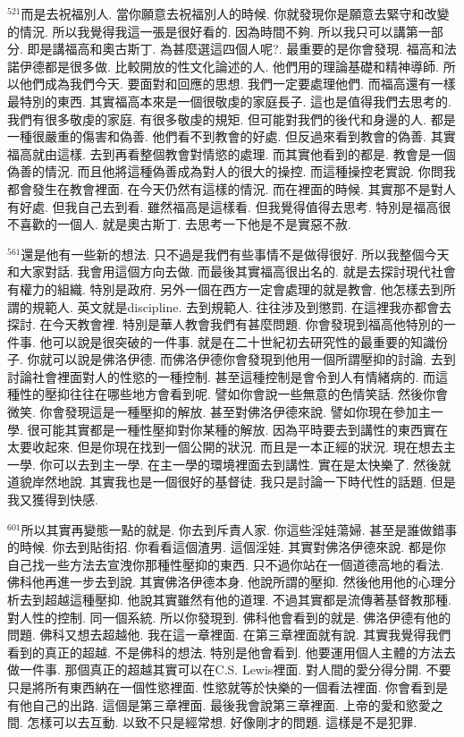 \documentclass{book}
\begin{document}
$^{521}$而是去祝福別人.
當你願意去祝福別人的時候.
你就發現你是願意去緊守和改變的情況.
所以我覺得我這一張是很好看的.
因為時間不夠.
所以我只可以講第一部分.
即是講福高和奧古斯丁.
為甚麼選這四個人呢?.
最重要的是你會發現.
福高和法諾伊德都是很多做.
比較開放的性文化論述的人.
他們用的理論基礎和精神導師.
所以他們成為我們今天.
要面對和回應的思想.
我們一定要處理他們.
而福高還有一樣最特別的東西.
其實福高本來是一個很敬虔的家庭長子.
這也是值得我們去思考的.
我們有很多敬虔的家庭.
有很多敬虔的規矩.
但可能對我們的後代和身邊的人.
都是一種很嚴重的傷害和偽善.
他們看不到教會的好處.
但反過來看到教會的偽善.
其實福高就由這樣.
去到再看整個教會對情慾的處理.
而其實他看到的都是.
教會是一個偽善的情況.
而且他將這種偽善成為對人的很大的操控.
而這種操控老實說.
你問我都會發生在教會裡面.
在今天仍然有這樣的情況.
而在裡面的時候.
其實那不是對人有好處.
但我自己去到看.
雖然福高是這樣看.
但我覺得值得去思考.
特別是福高很不喜歡的一個人.
就是奧古斯丁.
去思考一下他是不是實惡不赦.

$^{561}$還是他有一些新的想法.
只不過是我們有些事情不是做得很好.
所以我整個今天和大家對話.
我會用這個方向去做.
而最後其實福高很出名的.
就是去探討現代社會有權力的組織.
特別是政府.
另外一個在西方一定會處理的就是教會.
他怎樣去到所謂的規範人.
英文就是discipline.
去到規範人.
往往涉及到懲罰.
在這裡我亦都會去探討.
在今天教會裡.
特別是華人教會我們有甚麼問題.
你會發現到福高他特別的一件事.
他可以說是很突破的一件事.
就是在二十世紀初去研究性的最重要的知識份子.
你就可以說是佛洛伊德.
而佛洛伊德你會發現到他用一個所謂壓抑的討論.
去到討論社會裡面對人的性慾的一種控制.
甚至這種控制是會令到人有情緒病的.
而這種性的壓抑往往在哪些地方會看到呢.
譬如你會說一些無意的色情笑話.
然後你會微笑.
你會發現這是一種壓抑的解放.
甚至對佛洛伊德來說.
譬如你現在參加主一學.
很可能其實都是一種性壓抑對你某種的解放.
因為平時要去到講性的東西實在太要收起來.
但是你現在找到一個公開的狀況.
而且是一本正經的狀況.
現在想去主一學.
你可以去到主一學.
在主一學的環境裡面去到講性.
實在是太快樂了.
然後就道貌岸然地說.
其實我也是一個很好的基督徒.
我只是討論一下時代性的話題.
但是我又獲得到快感.

$^{601}$所以其實再變態一點的就是.
你去到斥責人家.
你這些淫娃蕩婦.
甚至是誰做錯事的時候.
你去到貼街招.
你看看這個渣男.
這個淫娃.
其實對佛洛伊德來說.
都是你自己找一些方法去宣洩你那種性壓抑的東西.
只不過你站在一個道德高地的看法.
佛科他再進一步去到說.
其實佛洛伊德本身.
他說所謂的壓抑.
然後他用他的心理分析去到超越這種壓抑.
他說其實雖然有他的道理.
不過其實都是流傳著基督教那種.
對人性的控制.
同一個系統.
所以你發現到.
佛科他會看到的就是.
佛洛伊德有他的問題.
佛科又想去超越他.
我在這一章裡面.
在第三章裡面就有說.
其實我覺得我們看到的真正的超越.
不是佛科的想法.
特別是他會看到.
他要運用個人主體的方法去做一件事.
那個真正的超越其實可以在C.S. Lewis裡面.
對人間的愛分得分開.
不要只是將所有東西納在一個性慾裡面.
性慾就等於快樂的一個看法裡面.
你會看到是有他自己的出路.
這個是第三章裡面.
最後我會說第三章裡面.
上帝的愛和慾愛之間.
怎樣可以去互動.
以致不只是經常想.
好像剛才的問題.
這樣是不是犯罪.
\end{document}

